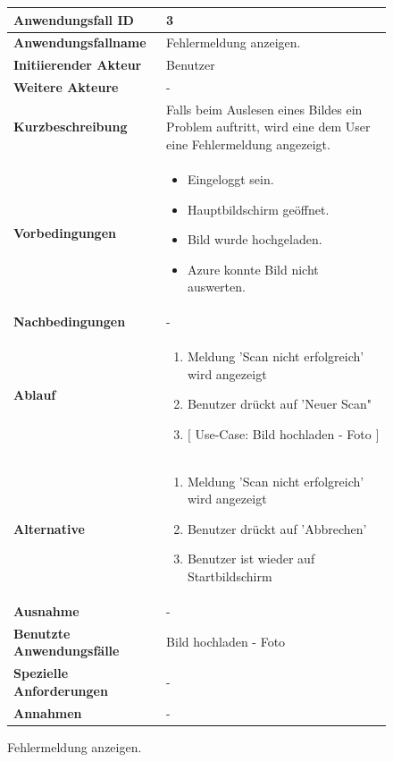 \newpage

\begin{figure}[h]
	\centering
	\begin{tabularx}{\textwidth}{ X | X }
		\textbf{Anwendungsfall ID} & 3 \\ \hline
		\textbf{Anwendungsfallname} & Fehlermeldung anzeigen. \\ \hline
		\textbf{Initiierender Akteur} & Benutzer \\ \hline
		\textbf{Weitere Akteure} & - \\ \hline
		\textbf{Kurzbeschreibung} & Falls beim Auslesen eines Bildes ein Problem auftritt, wird eine dem User eine Fehlermeldung angezeigt.   \\ \hline
		\textbf{Vorbedingungen} & 
		\begin {itemize}
			\item Eingeloggt sein. 
			\item Hauptbildschirm geöffnet.
			\item Bild wurde hochgeladen.
			\item Azure konnte Bild nicht auswerten.
		\end{itemize}\\ \hline
		\textbf{Nachbedingungen} & - \\ \hline
		\textbf{Ablauf} &
		\begin{enumerate}
			\item Meldung 'Scan nicht erfolgreich' wird angezeigt
			\item Benutzer drückt auf 'Neuer Scan"
			\item $\lbrack$ Use-Case: Bild hochladen - Foto $\rbrack$
		\end{enumerate} \\ \hline
		\textbf{Alternative} & 
		\begin{enumerate}
			\item Meldung 'Scan nicht erfolgreich' wird angezeigt
			\item Benutzer drückt auf 'Abbrechen'
			\item Benutzer ist wieder auf Startbildschirm
		\end{enumerate} \\ \hline
		\textbf{Ausnahme} & -   \\ \hline
		\textbf{Benutzte Anwendungsfälle} & Bild hochladen - Foto \\ \hline
		\textbf{Spezielle Anforderungen} & - \\ \hline
		\textbf{Annahmen} & -
	\end{tabularx}
	\caption{Fehlermeldung anzeigen.}
	\label{fig:anwendungsfall-server-tabelle-xx-1}
\end{figure}

